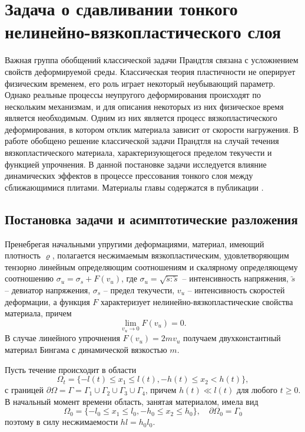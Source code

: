 \chapter{Задача о сдавливании тонкого нелинейно-вязкопластического слоя}\label{ch:ch4}
Важная группа обобщений классической задачи Прандтля \autocite{Prandtl:1948} связана с усложнением свойств деформируемой среды. Классическая теория пластичности не оперирует физическим временем, его роль играет некоторый неубывающий параметр. Однако реальные процессы неупругого деформирования происходят по нескольким механизмам, и для описания некоторых из них физическое время является необходимым. Одним из них является процесс вязкопластического деформирования, в котором отклик материала зависит от скорости нагружения. В работе \autocites{Georgievsky:2012} обобщено решение классической задачи Прандтля на случай течения вязкопластического материала, характеризующегося пределом текучести и функцией упрочнения. В данной постановке задачи исследуется влияние динамических эффектов в процессе прессования тонкого слоя между сближающимися плитами. Материалы главы содержатся в публикации .

\section{Постановка задачи и асимптотические разложения}\label{sec:ch4/sec1}

Пренебрегая начальными упругими деформациями, материал, имеющий плотность $\varrho$, полагается несжимаемым вязкопластическим, удовлетворяющим тензорно линейным определяющим соотношениям и скалярному определяющему соотношению  $\sigma_{u} = \sigma_{s} + F(v_{u})$, где $\sigma_{u} = \sqrt{\utilde{s} : \utilde{s}}$ -- интенсивность напряжения, $\utilde{s}$ -- девиатор напряжения, $\sigma_{s}$ -- предел текучести, $v_{u}$ -- интенсивность скоростей деформации, а функция $F$ характеризует нелинейно-вязкопластические свойства материала, причем
\begin{equation}
  \lim_{v_{u}\rightarrow 0}F(v_{u}) = 0.
\end{equation}
В случае линейного упрочнения $F(v_{u}) = 2 m v_{u}$ получаем двухконстантный материал Бингама с динамической вязкостью $m$.

Пусть течение происходит в области
\begin{equation}
  \Omega_{t} = \{-l(t) \le x_{1} \le l(t), -h(t) \le x_{2} < h(t)\},
\end{equation}
с границей $\partial\Omega = \Gamma = \Gamma_{1} \cup \Gamma_{2} \cup \Gamma_{3} \cup \Gamma_{4}$, причем $h(t) \ll l(t)$ для любого $t \ge 0$.
В начальный момент времени область, занятая материалом, имела вид
\begin{equation}
  \Omega_{0} = \{-l_{0} \le x_{1} \le l_{0}, -h_{0} \le x_{2} \le h_{0}\}, \quad \partial\Omega_{0} = \Gamma_{0}
\end{equation}
поэтому в силу несжимаемости $h l=h_{0} l_{0}$.

